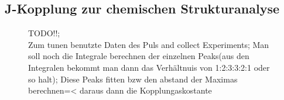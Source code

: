 \subsection{J-Kopplung zur chemischen Strukturanalyse}
\begin{figure}[H]
    \centering
    
    \caption{TODO!!;\\
    Zum tunen benutzte Daten des Puls and collect Experiments; Man soll noch die Integrale berechnen der einzelnen Peaks(aus den Integralen bekommt man dann das Verhältnuis von 1:2:3:3:2:1 oder so halt); Diese Peaks fitten bzw den abstand der Maximas berechnen=< daraus dann die Kopplungaskostante}
\end{figure}
